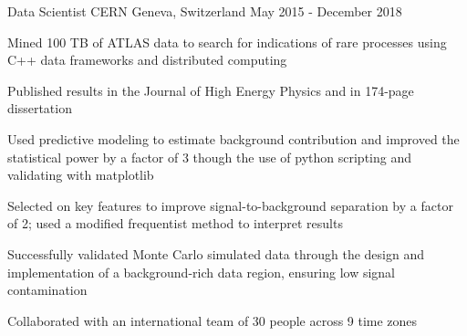 
\begin{cventries}

	\cventry
    {Data Scientist} %
    {CERN} %
    {Geneva, Switzerland} %
    {May 2015 - December 2018} %
    {
      \begin{cvitems} %
        \item {Mined 100 TB of ATLAS data to search for indications of rare processes using C++ data frameworks and distributed computing}
        \item{Published results in the Journal of High Energy Physics and in 174-page dissertation}
        \item{Used predictive modeling to estimate background contribution and improved the statistical power by a factor of 3 though the use of python scripting and validating with matplotlib}
        \item{Selected on key features to improve signal-to-background separation by a factor of 2; used a modified frequentist method to interpret results}
        \item{Successfully validated Monte Carlo simulated data through the design and implementation of a background-rich data region, ensuring low signal contamination}
        \item{Collaborated with an international team of 30 people across 9 time zones}
      \end{cvitems}
    }
   

\end{cventries}
